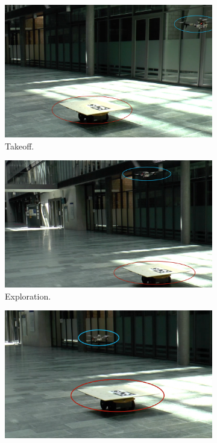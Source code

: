 \begin{figure}[!htbp]
  \centering
   \begin{subfigure}[b]{0.5\textwidth}
        \includegraphics[width=\textwidth]{img/takeoff1.png}
        \caption{Takeoff.}
   \end{subfigure}
   \begin{subfigure}[b]{0.5\textwidth}
        \includegraphics[width=\textwidth]{img/exploring1.png}
        \caption{Exploration.}
        \label{fig:two}
   \end{subfigure}
   \begin{subfigure}[b]{0.5\textwidth}
        \includegraphics[width=\textwidth]{img/align1.png}

\end{subfigure}
\end{figure}
